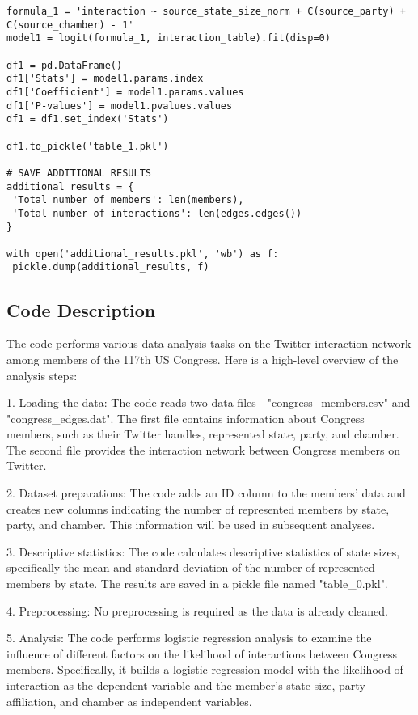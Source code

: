 \documentclass[11pt]{article}
\begin{document}
\begin{verbatim}
formula_1 = 'interaction ~ source_state_size_norm + C(source_party) + C(source_chamber) - 1'
model1 = logit(formula_1, interaction_table).fit(disp=0)

df1 = pd.DataFrame()
df1['Stats'] = model1.params.index
df1['Coefficient'] = model1.params.values
df1['P-values'] = model1.pvalues.values
df1 = df1.set_index('Stats')

df1.to_pickle('table_1.pkl')

# SAVE ADDITIONAL RESULTS
additional_results = {
 'Total number of members': len(members), 
 'Total number of interactions': len(edges.edges())
}

with open('additional_results.pkl', 'wb') as f:
 pickle.dump(additional_results, f)

\end{verbatim}

\subsection{Code Description}

The code performs various data analysis tasks on the Twitter interaction network among members of the 117th US Congress. Here is a high-level overview of the analysis steps:

1. Loading the data: The code reads two data files - "congress\_members.csv" and "congress\_edges.dat". The first file contains information about Congress members, such as their Twitter handles, represented state, party, and chamber. The second file provides the interaction network between Congress members on Twitter.

2. Dataset preparations: The code adds an ID column to the members' data and creates new columns indicating the number of represented members by state, party, and chamber. This information will be used in subsequent analyses.

3. Descriptive statistics: The code calculates descriptive statistics of state sizes, specifically the mean and standard deviation of the number of represented members by state. The results are saved in a pickle file named "table\_0.pkl".

4. Preprocessing: No preprocessing is required as the data is already cleaned.

5. Analysis: The code performs logistic regression analysis to examine the influence of different factors on the likelihood of interactions between Congress members. Specifically, it builds a logistic regression model with the likelihood of interaction as the dependent variable and the member's state size, party affiliation, and chamber as independent variables.
\end{document}
